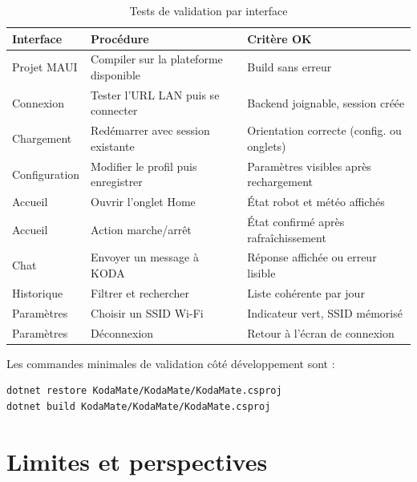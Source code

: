 \documentclass[a4paper,12pt]{report}
\begin{document}
	\begin{table}[H]
		\centering
		\caption{Tests de validation par interface}
		\label{tab:ch5-tests}
		\renewcommand{\arraystretch}{1.25}
		\begin{tabularx}{\textwidth}{|>{\raggedright\arraybackslash}p{3.3cm}|>{\raggedright\arraybackslash}X|>{\raggedright\arraybackslash}p{3.2cm}|}
			\hline
			\textbf{Interface} & \textbf{Procédure} & \textbf{Critère OK} \\
			\hline
			Projet MAUI & Compiler sur la plateforme disponible & Build sans erreur \\
			\hline
			Connexion & Tester l'URL LAN puis se connecter & Backend joignable, session créée \\
			\hline
			Chargement & Redémarrer avec session existante & Orientation correcte (config. ou onglets) \\
			\hline
			Configuration & Modifier le profil puis enregistrer & Paramètres visibles après rechargement \\
			\hline
			Accueil & Ouvrir l'onglet Home & État robot et météo affichés \\
			\hline
			Accueil & Action marche/arrêt & État confirmé après rafraîchissement \\
			\hline
			Chat & Envoyer un message à KODA & Réponse affichée ou erreur lisible \\
			\hline
			Historique & Filtrer et rechercher & Liste cohérente par jour \\
			\hline
			Paramètres & Choisir un SSID Wi-Fi & Indicateur vert, SSID mémorisé \\
			\hline
			Paramètres & Déconnexion & Retour à l'écran de connexion \\
			\hline
		\end{tabularx}
	\end{table}
	
	Les commandes minimales de validation côté développement sont :
	
\begin{lstlisting}[style=kodatest, language=shellkoda, caption={Commandes de validation du Cycle 5}]
dotnet restore KodaMate/KodaMate/KodaMate.csproj
dotnet build KodaMate/KodaMate/KodaMate.csproj
\end{lstlisting}
	
	\section{Limites et perspectives}
	
\end{document}
